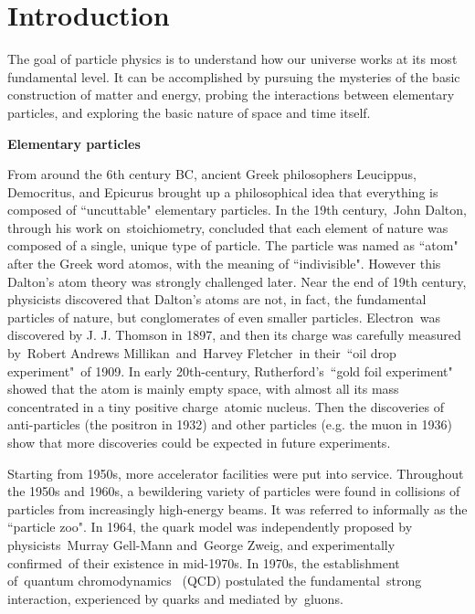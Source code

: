 
\chapter{Introduction}

The goal of particle physics is to understand how our universe works at its most fundamental level. It can be accomplished by pursuing the mysteries of the basic construction of matter and energy, probing the interactions between elementary particles, and exploring the basic nature of space and time itself. 

\textbf{Elementary particles}

From around the 6th century BC, ancient Greek philosophers Leucippus, Democritus, and Epicurus brought up a philosophical idea that everything is composed of ``uncuttable" elementary particles. 
In the 19th century, John Dalton, through his work on stoichiometry, concluded that each element of nature was composed of a single, unique type of particle. 
The particle was named as ``atom" after the Greek word atomos, with the meaning of ``indivisible". 
However this Dalton's atom theory was strongly challenged later. Near the end of 19th century, physicists discovered that Dalton's atoms are not, in fact, the fundamental particles of nature, 
but conglomerates of even smaller particles. 
Electron was discovered by J. J. Thomson in 1897, and then its charge was carefully measured by Robert Andrews Millikan and Harvey Fletcher in their ``oil drop experiment" of 1909. 
In early 20th-century, Rutherford's ``gold foil experiment" showed that the atom is mainly empty space, with almost all its mass concentrated in a tiny positive charge atomic nucleus. 
Then the discoveries of anti-particles (the positron in 1932) and other particles (e.g. the muon in 1936) show that more discoveries could be expected in future experiments.

Starting from 1950s, more accelerator facilities were put into service. 
Throughout the 1950s and 1960s, a bewildering variety of particles were found in collisions of particles from increasingly high-energy beams. 
It was referred to informally as the ``particle zoo".
In 1964, the quark model was independently proposed by physicists Murray Gell-Mann and George Zweig, and experimentally confirmed of their existence in mid-1970s. 
In 1970s, the establishment of quantum chromodynamics  (QCD) postulated the fundamental strong interaction, experienced by quarks and mediated by gluons.

